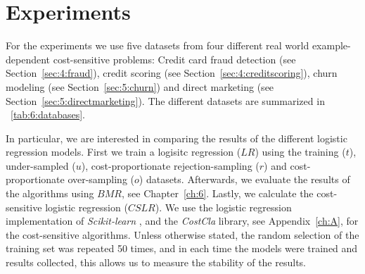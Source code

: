 % 
% 


\section{Experiments}
\label{sec:7:results}

For the experiments we use five datasets from four different real world example-dependent 
cost-sensitive problems: Credit card fraud detection (see Section~\ref{sec:4:fraud}), credit 
scoring (see Section~\ref{sec:4:creditscoring}), churn modeling (see Section~\ref{sec:5:churn}) and 
direct marketing (see Section~\ref{sec:5:directmarketing}). The different datasets are summarized 
in \tablename{~\ref{tab:6:databases}}.

In particular, we are interested in comparing the results of the different logistic regression 
models. First we train a logisitc regression ($LR$) using the training ($t$), under-sampled 
($u$), cost-proportionate rejection-sampling  ($r$) \citep{Zadrozny2003}  and  cost-proportionate 
over-sampling ($o$) \citep{Elkan2001} datasets. Afterwards,  we evaluate the results of  the 
algorithms using $BMR$, see Chapter~\ref{ch:6}. Lastly, we calculate the cost-sensitive 
logistic  regression ($CSLR$). We use the logistic regression implementation of
\textit{Scikit-learn} \citep{Pedregosa2011}, and the \textit{CostCla} library, see 
Appendix~\ref{ch:A}, for the cost-sensitive algorithms. Unless otherwise stated, the random 
selection of the training set was repeated 50 times, and in each time the models were trained and 
results collected, this allows us to measure the stability of the results.


